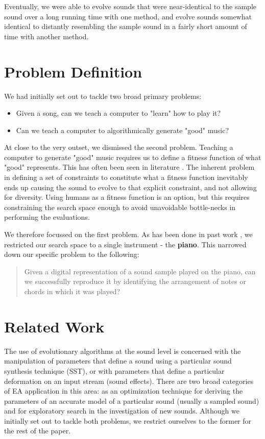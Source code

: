 \documentclass{pnastwo}
\begin{document}
\begin{article}
Eventually, we were able to evolve sounds that were near-identical to the sample sound over a long running time with one method, and evolve sounds somewhat identical to distantly resembling the sample sound in a fairly short amount of time with another method.

\section{Problem Definition}
We had initially set out to tackle two broad primary problems:
\begin{itemize}
\item Given a song, can we teach a computer to "learn" how to play it?
\item Can we teach a computer to algorithmically generate "good" music?
\end{itemize}
At close to the very outset, we dismissed the second problem. Teaching a computer to generate "good" music requires us to define a fitness function of what "good" represents. This has often been seen in literature \cite{biles} \cite{copley}. The inherent problem in defining a set of constraints to constitute what a fitness function inevitably ends up causing the sound to evolve to that explicit constraint, and not allowing for diversity. Using humans as a fitness function is an option, but this requires constraining the search space enough to avoid unavoidable bottle-necks in performing the evaluations. 

We therefore focussed on the first problem. As has been done in past work \cite{garcia}, we restricted our search space to a single instrument - the \textbf{piano}. This narrowed down our specific problem to the following:

\begin{quote} 
Given a digital representation of a sound sample played on the piano, can we successfully reproduce it by identifying the arrangement of notes or chords in which it was played?
\end{quote}


\section{Related Work}
The use of evolutionary algorithms at the sound level is concerned with the manipulation of parameters
that define a sound using a particular sound synthesis technique (SST), or with
parameters that define a particular deformation on an input stream (sound effects).
There are two broad categories of EA application in this area: as an optimization
technique for deriving the parameters of an accurate model of a particular sound
(usually a sampled sound) and for exploratory search in the investigation of new sounds. \cite{ecm2} Although we initially set out to tackle both problems, we restrict ourselves to the former for the rest of the paper. 


\end{article}
\end{document}

